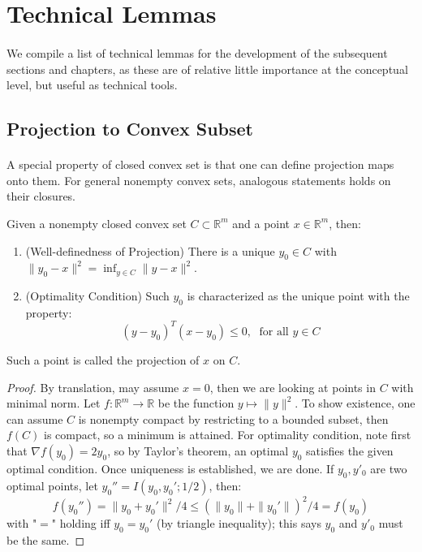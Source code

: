 \section{Technical Lemmas}
\label{sect:014}

\paragraph{}We compile a list of technical lemmas for the development of the subsequent sections and chapters, as these are of relative little importance at the conceptual level, but useful as technical tools.

\subsection{Projection to Convex Subset}
\paragraph{}A special property of closed convex set is that one can define projection maps onto them. For general nonempty convex sets, analogous statements holds on their closures.

\begin{lemm}\label{lemm:014-projection}
	Given a nonempty closed convex set $C\subset \mathbb{R}^m$ and a point $x\in \mathbb{R}^m$, then:
	\begin{enumerate}[label=(\alph*)]
		\item (Well-definedness of Projection) There is a unique $y_0\in C$ with $\|y_0-x\|^2=\inf_{y\in C}\|y-x\|^2$.
		\item (Optimality Condition) Such $y_0$ is characterized as the unique point with the property:
		      \[
			      (y-y_0)^T(x-y_0)\leq 0,\;\text{ for all }y\in C
		      \]
	\end{enumerate}
	Such a point is called the projection of $x$ on $C$.
\end{lemm}

\begin{proof}
	By translation, may assume $x=0$, then we are looking at points in $C$ with minimal norm. Let $f:\mathbb{R}^m\to \mathbb{R}$ be the function $y\mapsto \|y\|^2$. To show existence, one can assume $C$ is nonempty compact by restricting to a bounded subset, then $f(C)$ is compact, so a minimum is attained. For optimality condition, note first that $\nabla f(y_0)=2y_0$, so by Taylor's theorem, an optimal $y_0$ satisfies the given optimal condition. Once uniqueness is established, we are done. If $y_0,y'_0$ are two optimal points, let $y_0''=I(y_0,y_0';1/2)$, then:
	\[
		f(y_0'')=\|y_0+y_0'\|^2/4\leq (\|y_0\|+\|y_0'\|)^2/4 =f(y_0)
	\]
	with "$=$" holding iff $y_0=y_0'$ (by triangle inequality); this says $y_0$ and $y'_0$ must be the same.
\end{proof}

